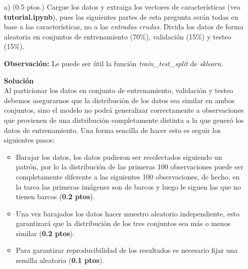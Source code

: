 \documentclass[11pt,letterpaper]{article}
\begin{document}
\begin{enumerate}

\item[a)](0.5 ptos.) Cargue los datos y extraiga los vectores de características (vea \textbf{tutorial.ipynb}), pues las siguientes partes de esta pregunta serán todas en base a las características, no a las  \emph{entradas crudas}. Divida los datos de forma aleatoria en conjuntos de entrenamiento (70\%), validación (15\%) y testeo (15\%). 

\textbf{Observación:} Le puede ser útil la función \textit{train\_test\_split} de \textit{sklearn}.

\textbf{Solución}\\

Al particionar los datos en conjunto de entrenamiento, validación y testeo debemos asegurarnos que la distribución de los datos sea similar en ambos conjuntos, sino el modelo no podrá generalizar correctamente a observaciones que provienen de una distribución completamente distinta a la que generó los datos de entrenamiento. Una forma sencilla de hacer esto es seguir los siguientes pasos:

\begin{itemize}
    \item Barajar los datos, los datos pudieron ser recolectados siguiendo un patrón, por lo la distribución de las primeras 100 observaciones puede ser completamente diferente a las siguientes 100 observaciones, de hecho, en la tarea las primeras imágenes son de barcos y luego le siguen las que no tienen barcos (\textbf{0.2 ptos}).
    \item Una vez barajados los datos hacer muestro aleatorio independiente, esto garantizará que la distribución de los tres conjuntos sea más o menos similar (\textbf{0.2 ptos}).
    \item Para garantizar reproducibilidad de los resultados es necesario fijar una semilla aleatoria (\textbf{0.1 ptos}).
\end{itemize}


\end{enumerate}
\end{document}
